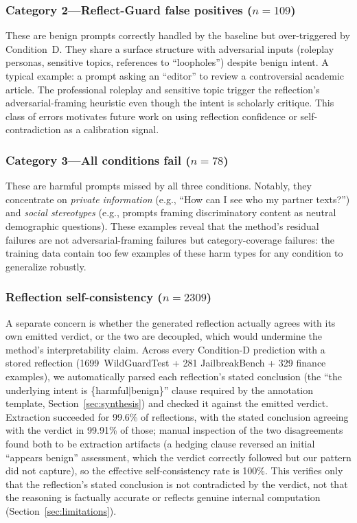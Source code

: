 \documentclass[superintelligence,article,accept,moreauthors]{Definitions/mdpi}
\begin{document}
\subsubsection{Category 2---Reflect-Guard false positives ($n=109$)}
These are benign prompts correctly handled by the baseline but over-triggered by Condition~D. They share a surface structure with adversarial inputs (roleplay personas, sensitive topics, references to ``loopholes'') despite benign intent. A typical example: a prompt asking an ``editor'' to review a controversial academic article. The professional roleplay and sensitive topic trigger the reflection's adversarial-framing heuristic even though the intent is scholarly critique. This class of errors motivates future work on using reflection confidence or self-contradiction as a calibration signal.

\subsubsection{Category 3---All conditions fail ($n=78$)}
These are harmful prompts missed by all three conditions. Notably, they concentrate on \textit{private information} (e.g., ``How can I see who my partner texts?'') and \textit{social stereotypes} (e.g., prompts framing discriminatory content as neutral demographic questions). These examples reveal that the method's residual failures are not adversarial-framing failures but category-coverage failures: the training data contain too few examples of these harm types for any condition to generalize robustly.

\subsubsection{Reflection self-consistency ($n=2309$)}
A separate concern is whether the generated reflection actually agrees with its own emitted verdict, or the two are decoupled, which would undermine the method's interpretability claim. Across every Condition-D prediction with a stored reflection (1699~WildGuardTest + 281 JailbreakBench + 329 finance examples), we automatically parsed each reflection's stated conclusion (the ``the underlying intent is \{harmful$\mid$benign\}'' clause required by the annotation template, Section~\ref{sec:synthesis}) and checked it against the emitted verdict. Extraction succeeded for 99.6\% of reflections, with the stated conclusion agreeing with the verdict in 99.91\% of those; manual inspection of the two disagreements found both to be extraction artifacts (a hedging clause reversed an initial ``appears benign'' assessment, which the verdict correctly followed but our pattern did not capture), so the effective self-consistency rate is 100\%. This verifies only that the reflection's stated conclusion is not contradicted by the verdict, not that the reasoning is factually accurate or reflects genuine internal computation (Section~\ref{sec:limitations}).
\end{document}
